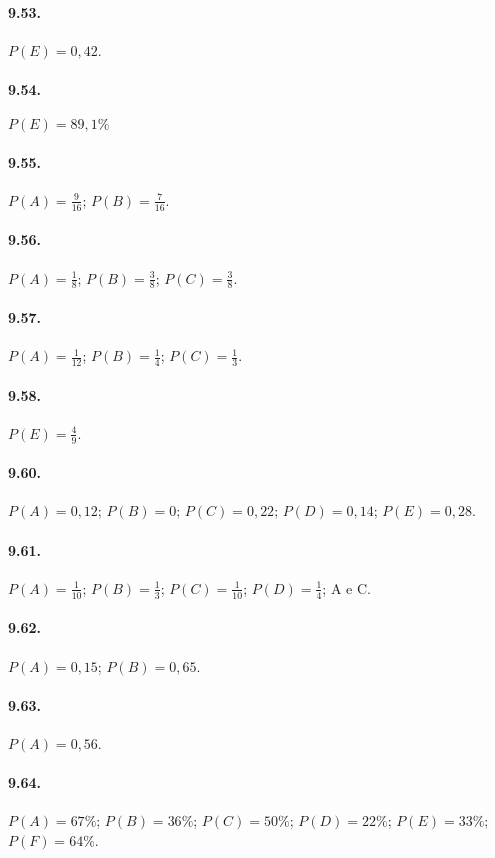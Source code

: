 \begin{multicols}{2}
\paragraph{9.53.} $P(E)=0,42$.

\paragraph{9.54.} $P(E)=89,1\%$

\paragraph{9.55.} $ P(A)=\frac 9 {16}$; $P(B)=\frac 7 {16} $.

\paragraph{9.56.} $ P(A)=\frac 1 8$; $P(B)=\frac3 8$; $P(C)=\frac 3 8 $.

\paragraph{9.57.} $ P(A)=\frac 1 {12}$; $P(B)=\frac1 4$; $P(C)=\frac 1 3 $.

\paragraph{9.58.} $ P(E)=\frac 4 9 $.

\paragraph{9.60.} $P(A)=0,12$; $P(B)=0$; $P(C)=0,22$; $P(D)=0,14$; $P(E)=0,28$.

\paragraph{9.61.} $ P(A)=\frac 1{10} $; $ P(B)=\frac 1 3 $; $ P(C)=\frac 1{10} $; $ P(D)=\frac 1 4 $; A e C.

\paragraph{9.62.} $P(A)=0,15$; $P(B)=0,65$.

\paragraph{9.63.} $P(A)=0,56$.

\paragraph{9.64.} $P(A)=67\%$; $P(B)=36\%$; $P(C)=50\%$; $P(D)=22\%$; $P(E)=33\%$; $P(F)=64\%$.
\end{multicols}
